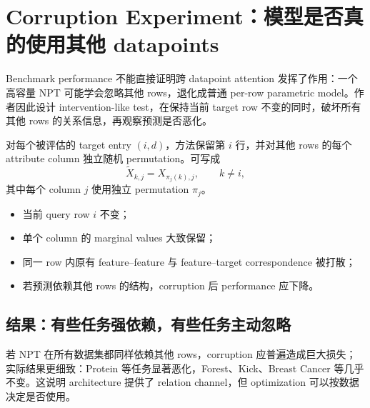\section{Corruption Experiment：模型是否真的使用其他 datapoints}

Benchmark performance 不能直接证明跨 datapoint attention 发挥了作用：一个高容量 NPT 可能学会忽略其他 rows，退化成普通 per-row parametric model。作者因此设计 intervention-like test，在保持当前 target row 不变的同时，破坏所有其他 rows 的关系信息，再观察预测是否恶化。


对每个被评估的 target entry $(i,d)$，方法保留第 $i$ 行，并对其他 rows 的每个 attribute column 独立随机 permutation。可写成
\[
\widetilde X_{k,j}=X_{\pi_j(k),j},
\qquad k\ne i,
\]
其中每个 column $j$ 使用独立 permutation $\pi_j$。

\begin{itemize}
  \item 当前 query row $i$ 不变；
  \item 单个 column 的 marginal values 大致保留；
  \item 同一 row 内原有 feature--feature 与 feature--target correspondence 被打散；
  \item 若预测依赖其他 rows 的结构，corruption 后 performance 应下降。
\end{itemize}



\subsection{结果：有些任务强依赖，有些任务主动忽略}

若 NPT 在所有数据集都同样依赖其他 rows，corruption 应普遍造成巨大损失；实际结果更细致：Protein 等任务显著恶化，Forest、Kick、Breast Cancer 等几乎不变。这说明 architecture 提供了 relation channel，但 optimization 可以按数据决定是否使用。


